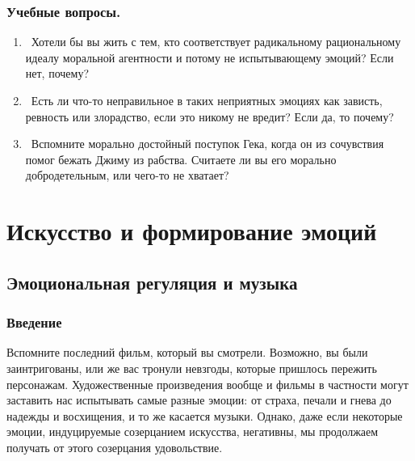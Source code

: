 \documentclass[11pt]{book}
\begin{document}
\begin{tcolorbox}
  \section{Учебные вопросы.}
  \begin{enumerate}
    \item\ Хотели бы вы жить с тем, кто соответствует радикальному рациональному идеалу моральной агентности и потому не испытывающему эмоций? Если нет, почему?
    \item\ Есть ли что-то неправильное в таких неприятных эмоциях как зависть, ревность или злорадство, если это никому не вредит? Если да, то почему?
    \item\ Вспомните морально достойный поступок Гека, когда он из сочувствия помог бежать Джиму из рабства. Считаете ли вы его морально добродетельным, или чего-то не хватает?
  \end{enumerate}
\end{tcolorbox}

\part{Искусство и формирование эмоций}

\chapter{Эмоциональная регуляция и музыка}

\section{Введение}

Вспомните последний фильм, который вы смотрели. Возможно, вы были заинтригованы, или же вас тронули невзгоды, которые пришлось пережить персонажам. Художественные произведения вообще и фильмы в частности могут заставить нас испытывать самые разные эмоции: от страха, печали и гнева до надежды и восхищения, и то же касается музыки. Однако, даже если некоторые эмоции, индуцируемые созерцанием искусства, негативны, мы продолжаем получать от этого созерцания удовольствие.
\end{document}
